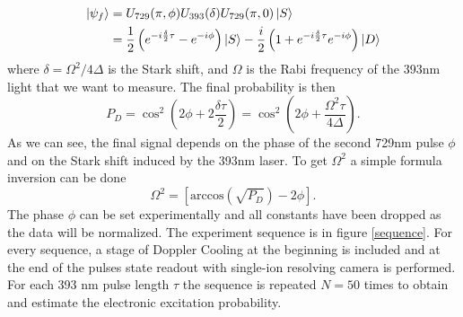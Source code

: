 \begin{equation}
\begin{split}
\ket{\psi_f} &= U_{729}(\pi,\phi)U_{393}(\delta)U_{729}(\pi,0)\ket{S} \\
&= \frac{1}{2}\left(e^{-i\frac{\delta}{2}\tau}-e^{-i\phi}\right)\ket{S}-\frac{i}{2}\left(1 + e^{-i\frac{\delta}{2}\tau} e^{-i\phi}\right)\ket{D}
\end{split}
\end{equation}
where $\delta = \Omega^2/4\Delta$ is the Stark shift, and $\Omega$ is the Rabi frequency of the 393nm light that we want to measure. The final probability is then
\begin{equation}
\label{stupidequation}
P_D = \cos^2\left(2\phi + 2\frac{\delta \tau}{2}\right) = \cos^2\left(2\phi + \frac{\Omega^2 \tau}{4\Delta}\right).
\end{equation}
As we can see, the final signal depends on the phase of the second 729nm pulse $\phi$ and on the Stark shift induced by the 393nm laser. To get $\Omega^2$ a simple formula inversion can be done
\begin{equation}
\label{eq:ptointensity}
\Omega^2 = \left[\text{arccos}\left(\sqrt{P_D}\right)-2\phi \right].
\end{equation}
The phase $\phi$ can be set experimentally and all constants have been dropped as the data will be normalized. The experiment sequence is in figure \ref{sequence}. For every sequence, a stage of Doppler Cooling at the beginning is included and at the end of the pulses state readout with single-ion resolving camera is performed. For each 393 nm pulse length $\tau$ the sequence is repeated $N=50$ times to obtain and estimate the electronic excitation probability.


